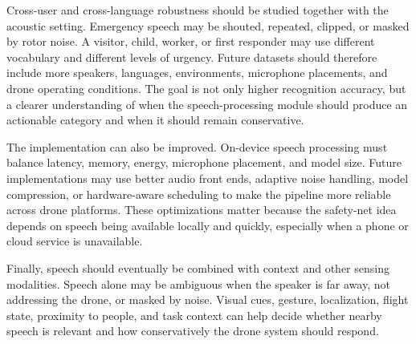 Cross-user and cross-language robustness should be studied together with the acoustic setting. Emergency speech may be shouted, repeated, clipped, or masked by rotor noise. A visitor, child, worker, or first responder may use different vocabulary and different levels of urgency. Future datasets should therefore include more speakers, languages, environments, microphone placements, and drone operating conditions. The goal is not only higher recognition accuracy, but a clearer understanding of when the speech-processing module should produce an actionable category and when it should remain conservative.

The implementation can also be improved. On-device speech processing must balance latency, memory, energy, microphone placement, and model size. Future implementations may use better audio front ends, adaptive noise handling, model compression, or hardware-aware scheduling to make the pipeline more reliable across drone platforms. These optimizations matter because the safety-net idea depends on speech being available locally and quickly, especially when a phone or cloud service is unavailable.

Finally, speech should eventually be combined with context and other sensing modalities. Speech alone may be ambiguous when the speaker is far away, not addressing the drone, or masked by noise. Visual cues, gesture, localization, flight state, proximity to people, and task context can help decide whether nearby speech is relevant and how conservatively the drone system should respond.
